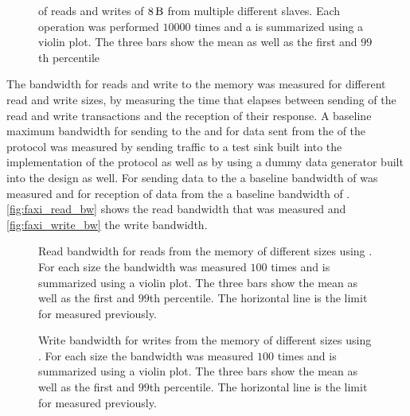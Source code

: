 \begin{figure}
\label{fig:faxi-rtt}
\caption{\rtt{} of reads and writes of $\SI{8}{\byte}$ from multiple different \AXI{} slaves. Each operation was performed $\num{10000}$ times and a is summarized using a violin plot. The three bars show the mean as well as the first and $99$th percentile}
\end{figure}

The bandwidth for reads and write to the \DDR{} memory was measured for different read and write sizes, by measuring the time that elapses between sending of the read and write transactions and the reception of their response. A baseline maximum bandwidth for sending to the \FPGA{} and for data sent from the \FPGA{} of the \HostARQ{} protocol was measured by sending \HostARQ{} traffic to a test sink built into the \FPGA{} implementation of the \HostARQ{} protocol as well as by using a dummy data generator built into the design as well. For sending data to the \FPGA{} a baseline bandwidth of  was measured and for reception of data from the \FPGA{} a baseline bandwidth of . \autoref{fig:faxi_read_bw} shows the read bandwidth that was measured and \autoref{fig:faxi_write_bw} the write bandwidth.

\begin{figure}
\caption{Read bandwidth for reads from the \DDR{} memory of different sizes using \FAXI{}. For each size the bandwidth was measured $\num{100}$ times and is summarized using a violin plot. The three bars show the mean as well as the first and $99$th percentile. The horizontal line is the limit for \HostARQ{} measured previously.}\label{fig:faxi_read_bw}
\end{figure}

\begin{figure}
\caption{Write bandwidth for writes from the \DDR{} memory of different sizes using \FAXI{}. For each size the bandwidth was measured $\num{100}$ times and is summarized using a violin plot. The three bars show the mean as well as the first and $99$th percentile. The horizontal line is the limit for \HostARQ{} measured previously.}\label{fig:faxi_write_bw}
\end{figure}


